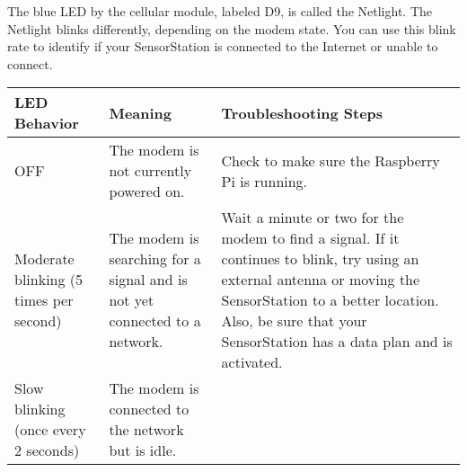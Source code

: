 \documentclass[
]{article}
\begin{document}
The blue LED by the cellular module, labeled D9, is called the Netlight.
The Netlight blinks differently, depending on the modem state. You can
use this blink rate to identify if your SensorStation is connected to
the Internet or unable to connect.

\begin{longtable}[]{@{}lll@{}}
\toprule
\begin{minipage}[b]{0.26\columnwidth}\raggedright
LED Behavior\strut
\end{minipage} & \begin{minipage}[b]{0.32\columnwidth}\raggedright
Meaning\strut
\end{minipage} & \begin{minipage}[b]{0.33\columnwidth}\raggedright
Troubleshooting Steps\strut
\end{minipage}\tabularnewline
\midrule
\endhead
\begin{minipage}[t]{0.26\columnwidth}\raggedright
OFF\strut
\end{minipage} & \begin{minipage}[t]{0.32\columnwidth}\raggedright
The modem is not currently powered on.\strut
\end{minipage} & \begin{minipage}[t]{0.33\columnwidth}\raggedright
Check to make sure the Raspberry Pi is running.\strut
\end{minipage}\tabularnewline
\begin{minipage}[t]{0.26\columnwidth}\raggedright
Moderate blinking (5 times per second)\strut
\end{minipage} & \begin{minipage}[t]{0.32\columnwidth}\raggedright
The modem is searching for a signal and is not yet connected to a
network.\strut
\end{minipage} & \begin{minipage}[t]{0.33\columnwidth}\raggedright
Wait a minute or two for the modem to find a signal. If it continues to
blink, try using an external antenna or moving the SensorStation to a
better location. Also, be sure that your SensorStation has a data plan
and is activated.\strut
\end{minipage}\tabularnewline
\begin{minipage}[t]{0.26\columnwidth}\raggedright
Slow blinking (once every 2 seconds)\strut
\end{minipage} & \begin{minipage}[t]{0.32\columnwidth}\raggedright
The modem is connected to the network but is idle.\strut

\end{minipage}
\end{longtable}
\end{document}
